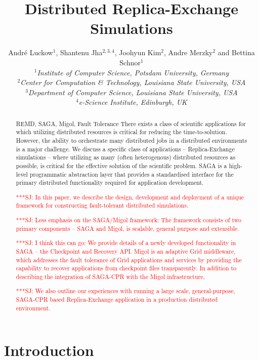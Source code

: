 \documentclass{rspublic}
\title[Distributed Replica-Exchange Simulations]{Distributed
  Replica-Exchange Simulations}
\author[Luckow, Jha, Kim, Merzky, Schnor]{
  Andr\'e Luckow$^{1}$, Shantenu Jha$^{2,3,4}$, Joohyun Kim$^{2}$, Andre Merzky$^{2}$ and Bettina Schnor$^{1}$\\
  \small{\emph{$^{1}$Institute of Computer Science, Potsdam University, Germany}}\\
  \small{\emph{$^{2}$Center for Computation \& Technology, Louisiana State University, USA}}\\
  \small{\emph{$^{3}$Department of Computer Science, Louisiana State
      University, USA}}\\
  \small{\emph{$^{4}$e-Science Institute, Edinburgh, UK}}\\
}
\newcommand{\jhanote}[1]{ {\textcolor{red} { ***SJ: #1 }}}
\newcommand{\jhanote}[1]{}
\begin{document}
 


\maketitle    

\begin{abstract}{REMD, SAGA, Migol, Fault Tolerance}  
  There exists a class of scientific applications for which utilizing
  distributed resources is critical for reducing the
  time-to-solution. However, the ability to orchestrate many
  distributed jobs in a distributed environments is a major challenge.
  We discuss a specific class of applications -- Replica-Exchange
  simulations -- where utilizing as many (often heterogenous)
  distributed resources as possible, is critical for the effective
  solution of the scientific problem.  SAGA is a high-level
  programmatic abstraction layer that provides a standardised
  interface for the primary distributed functionality required for
  application development.

  \jhanote{In this paper, we describe the design, development and
    deployment of a unique framework for constructing fault-tolerant
    distributed simulations.}

  \jhanote{Less emphasis on the SAGA/Migol framework: The framework
    consists of two primary components -- SAGA and Migol, is scalable,
    general purpose and extensible.}

  \jhanote{I think this can go: We provide details of a newly
    developed functionality in SAGA -- the Checkpoint and Recovery
    API. Migol is an adaptive Grid middleware, which addresses the
    fault tolerance of Grid applications and services by providing the
    capability to recover applications from checkpoint files
    transparently.  In addition to describing the integration of
    SAGA-CPR with the Migol infrastructure,}

  \jhanote{We also outline our experiences with running a large scale,
    general-purpose, SAGA-CPR based Replica-Exchange application in a
    production distributed environment.}

\end{abstract}

\section{Introduction}
                 
\end{document}
